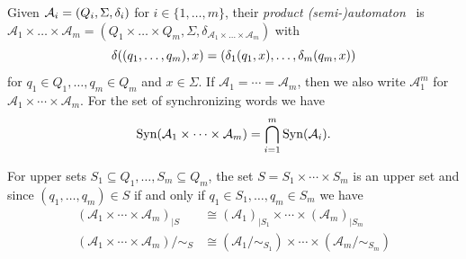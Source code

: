 

\label{def:product_aut} 
Given $\mathcal A_i = (Q_i, \Sigma, \delta_i)$
for $i \in \{1,\ldots,m\}$,  
their \emph{product (semi\mbox{-)}automaton}~\cite{HopUll79,DBLP:journals/ibmrd/RabinS59} 
is $\mathcal A_1 \times \ldots \times \mathcal A_m = (Q_1 \times \ldots \times Q_m,\Sigma, \delta_{\mathcal A_1 \times \ldots \times \mathcal A_m})$ with 
\[ 
\delta((q_1, \ldots, q_m),x)
= (\delta_1(q_1,x), \ldots, \delta_m(q_m,x))
\]
for $q_1 \in Q_1, \ldots, q_m \in Q_m$ and $x \in \Sigma$.
If $\mathcal A_1 = \cdots = \mathcal A_m$, then
we also write $\mathcal A_1^m$
for~$\mathcal A_1 \times \cdots \times \mathcal A_m$.
For the set of synchronizing words we have
\begin{equation}\label{prelim:eqn:product_aut_sync_words}
	\operatorname{Syn}(\mathcal A_1 \times \cdots \times \mathcal A_m)
	= \bigcap_{i=1}^m \operatorname{Syn}(\mathcal A_i).
\end{equation}

For upper sets $S_1 \subseteq Q_1, \ldots, S_m \subseteq Q_m$,
the set $S = S_1 \times \cdots \times S_m$ is an upper set
and since $(q_1, \ldots, q_m) \in S$ if and only if $q_1 \in S_1, \ldots, q_m \in S_m$
we have
\begin{align}
	(\mathcal A_1 \times \cdots \times \mathcal A_m)_{|S} & \cong 
	( \mathcal A_1 )_{|S_1} \times \cdots \times ( \mathcal A_m )_{|S_m} \label{prelim:automata:prod:eqn:sub} \\
	(\mathcal A_1 \times \cdots \times \mathcal A_m) / {\sim_S} 
	& \cong ( \mathcal A_1 / {\sim_{S_1}} ) \times \cdots \times ( \mathcal A_m / {\sim_{S_m}} ) \label{prelim:automata:prod:eqn:quot}
\end{align}